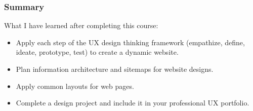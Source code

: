 \subsubsection{Summary}
\begin{flushleft}
	What I have learned after completing this course:
	\begin{itemize}
		\item Apply each step of the UX design thinking framework (empathize, define, ideate, prototype, test) to create a dynamic website.
		\item Plan information architecture and sitemaps for website designs.
		\item Apply common layouts for web pages.
		\item Complete a design project and include it in your professional UX portfolio.
	\end{itemize}
\end{flushleft}

